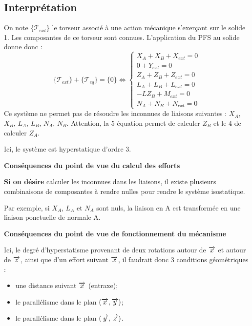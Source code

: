 \documentclass[10pt]{article}
\begin{document}
\subsection*{Interprétation}

On note $\{\mathcal{T}_{ext}\}$ le torseur associé à une action mécanique s'exerçant sur le solide 1. Les composantes de ce torseur sont connues. L'application du PFS au solide donne donc :
$$
\{\mathcal{T}_{ext}\} + \{\mathcal{T}_{eq}\}= \{0\} \Longleftrightarrow
\left\{
\begin{array}{l}
X_A+X_B+X_{ext}=0 \\
0+Y_{ext}=0 \\
Z_A+Z_B+Z_{ext}=0 \\
L_A+L_B+L_{ext}=0 \\
-LZ_B+M_{ext}=0 \\
N_A+N_B+N_{ext}=0 
\end{array}
\right.
$$
Ce système ne permet pas de résoudre les inconnues de liaisons suivantes : $X_A$, $X_B$, $L_A$, $L_B$, $N_A$, $N_B$. Attention, la 5\ieme{} équation permet de calculer $Z_B$ et le 4\ieme{} de calculer $Z_A$. 

Ici, le système est hyperstatique d'ordre 3.

\textbf{Conséquences du point de vue du calcul des efforts}

\textbf{Si on désire} calculer les inconnues dans les liaisons, il existe plusieurs combinaisons 
de composantes à rendre nulles pour rendre le système isostatique. 

Par exemple, si $X_A$, $L_A$ et $N_A$ sont nuls, la liaison en A est transformée en une liaison ponctuelle de normale A. 


\textbf{Conséquences du point de vue de fonctionnement du mécanisme}

Ici, le degré d'hyperstatisme provenant de deux rotations autour de $\overrightarrow{x}$ et autour de $\overrightarrow{z}$, ainsi que d'un effort suivant $\overrightarrow{x}$, il faudrait donc 3 conditions géométriques : 
\begin{itemize}
\item une distance suivant $\overrightarrow{x}$ (entraxe);
\item le parallélisme dans le plan $(\overrightarrow{x},\overrightarrow{y})$;
\item le parallélisme dans le plan $(\overrightarrow{y},\overrightarrow{z})$.
\end{itemize}


\end{document}
